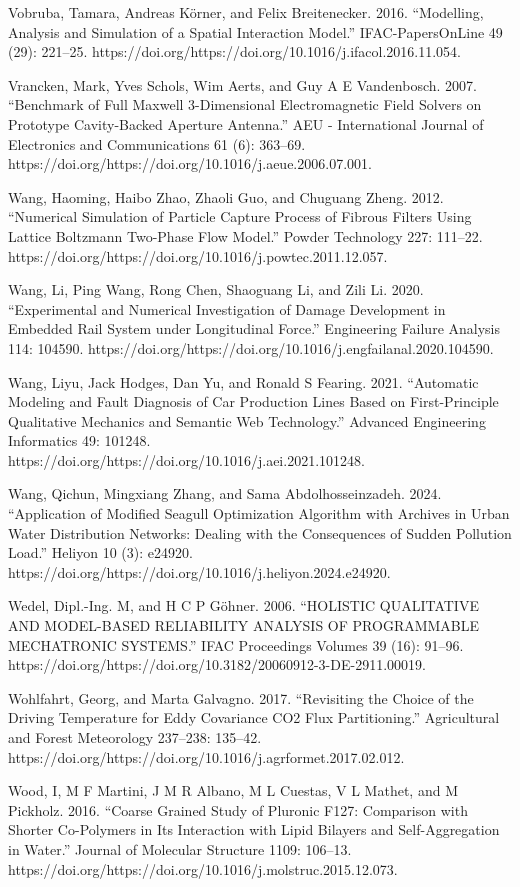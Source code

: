 \documentclass[utf8]{gradu3}
\begin{document}
Vobruba, Tamara, Andreas Körner, and Felix Breitenecker. 2016. “Modelling, Analysis and Simulation of a Spatial Interaction Model.” IFAC-PapersOnLine 49 (29): 221–25. https://doi.org/https://doi.org/10.1016/j.ifacol.2016.11.054.

Vrancken, Mark, Yves Schols, Wim Aerts, and Guy A E Vandenbosch. 2007. “Benchmark of Full Maxwell 3-Dimensional Electromagnetic Field Solvers on Prototype Cavity-Backed Aperture Antenna.” AEU - International Journal of Electronics and Communications 61 (6): 363–69. https://doi.org/https://doi.org/10.1016/j.aeue.2006.07.001.

Wang, Haoming, Haibo Zhao, Zhaoli Guo, and Chuguang Zheng. 2012. “Numerical Simulation of Particle Capture Process of Fibrous Filters Using Lattice Boltzmann Two-Phase Flow Model.” Powder Technology 227: 111–22. https://doi.org/https://doi.org/10.1016/j.powtec.2011.12.057.

Wang, Li, Ping Wang, Rong Chen, Shaoguang Li, and Zili Li. 2020. “Experimental and Numerical Investigation of Damage Development in Embedded Rail System under Longitudinal Force.” Engineering Failure Analysis 114: 104590. https://doi.org/https://doi.org/10.1016/j.engfailanal.2020.104590.

Wang, Liyu, Jack Hodges, Dan Yu, and Ronald S Fearing. 2021. “Automatic Modeling and Fault Diagnosis of Car Production Lines Based on First-Principle Qualitative Mechanics and Semantic Web Technology.” Advanced Engineering Informatics 49: 101248. https://doi.org/https://doi.org/10.1016/j.aei.2021.101248.

Wang, Qichun, Mingxiang Zhang, and Sama Abdolhosseinzadeh. 2024. “Application of Modified Seagull Optimization Algorithm with Archives in Urban Water Distribution Networks: Dealing with the Consequences of Sudden Pollution Load.” 
Heliyon 10 (3): e24920. https://doi.org/https://doi.org/10.1016/j.heliyon.2024.e24920.

Wedel, Dipl.-Ing. M, and H C P Göhner. 2006. “HOLISTIC QUALITATIVE AND MODEL-BASED RELIABILITY ANALYSIS OF PROGRAMMABLE MECHATRONIC SYSTEMS.” IFAC Proceedings Volumes 39 (16): 91–96. https://doi.org/https://doi.org/10.3182/20060912-3-DE-2911.00019.

Wohlfahrt, Georg, and Marta Galvagno. 2017. “Revisiting the Choice of the Driving Temperature for Eddy Covariance CO2 Flux Partitioning.” Agricultural and Forest Meteorology 237–238: 135–42. https://doi.org/https://doi.org/10.1016/j.agrformet.2017.02.012.

Wood, I, M F Martini, J M R Albano, M L Cuestas, V L Mathet, and M Pickholz. 2016. “Coarse Grained Study of Pluronic F127: Comparison with Shorter Co-Polymers in Its Interaction with Lipid Bilayers and Self-Aggregation in Water.” Journal of Molecular Structure 1109: 106–13. https://doi.org/https://doi.org/10.1016/j.molstruc.2015.12.073.
\end{document}
